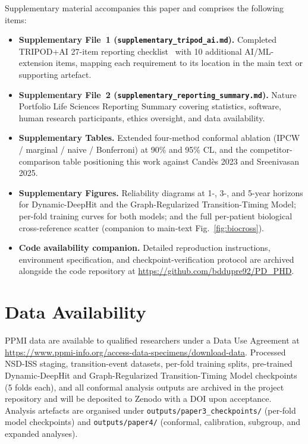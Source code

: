 \documentclass[11pt]{article}
\begin{document}
Supplementary material accompanies this paper and comprises the following items:
\begin{itemize}
  \item \textbf{Supplementary File~1 (\texttt{supplementary\_tripod\_ai.md}).} Completed TRIPOD+AI 27-item reporting checklist~\cite{collins2024tripodai} with 10 additional AI/ML-extension items, mapping each requirement to its location in the main text or supporting artefact.
  \item \textbf{Supplementary File~2 (\texttt{supplementary\_reporting\_summary.md}).} Nature Portfolio Life Sciences Reporting Summary covering statistics, software, human research participants, ethics oversight, and data availability.
  \item \textbf{Supplementary Tables.} Extended four-method conformal ablation (IPCW / marginal / naive / Bonferroni) at 90\% and 95\% CL, and the competitor-comparison table positioning this work against Cand\`{e}s 2023 and Sreenivasan 2025.
  \item \textbf{Supplementary Figures.} Reliability diagrams at 1-, 3-, and 5-year horizons for Dynamic-DeepHit and the Graph-Regularized Transition-Timing Model; per-fold training curves for both models; and the full per-patient biological cross-reference scatter (companion to main-text Fig.~\ref{fig:biocross}).
  \item \textbf{Code availability companion.} Detailed reproduction instructions, environment specification, and checkpoint-verification protocol are archived alongside the code repository at \url{https://github.com/bddupre92/PD_PHD}.
\end{itemize}

\section*{Data Availability}

PPMI data are available to qualified researchers under a Data Use Agreement at \url{https://www.ppmi-info.org/access-data-specimens/download-data}. Processed NSD-ISS staging, transition-event datasets, per-fold training splits, pre-trained Dynamic-DeepHit and Graph-Regularized Transition-Timing Model checkpoints (5 folds each), and all conformal analysis outputs are archived in the project repository and will be deposited to Zenodo with a DOI upon acceptance. Analysis artefacts are organised under \texttt{outputs/paper3\_checkpoints/} (per-fold model checkpoints) and \texttt{outputs/paper4/} (conformal, calibration, subgroup, and expanded analyses).
\end{document}
